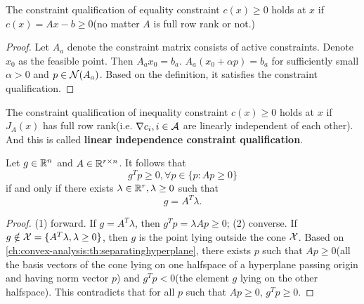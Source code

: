\begin{refsection}
\begin{lemma}
	The constraint qualification of equality constraint $c(x) \geq 0$ holds at $x$ if $c(x) = Ax - b \geq 0$(no matter $A$ is full row rank or not.) 
\end{lemma}
\begin{proof}
Let $A_a$ denote the constraint matrix consists of active constraints. Denote $x_0$ as the feasible point. Then $A_a x_0 = b_a$. $A_a(x_0 + \alpha p) = b_a$ for sufficiently small $\alpha > 0$ and $p\in \mathcal{N}(A_a)$. Based on the definition, it satisfies the constraint qualification.
\end{proof}


\begin{lemma}\cite[324]{nocedal2006numerical}
The constraint qualification of inequality constraint $c(x) \geq 0$ holds at $x$ if $J_A(x)$ has full row rank(i.e. $\nabla c_i, i\in \mathcal{A}$ are linearly independent of each other). And this is called \textbf{linear independence constraint qualification}.
\end{lemma}




\begin{lemma}\label{ch:constrained-nonlinear-optimization:th:FarkasLemmaAlternative}
Let $g\in \mathbb{R}^n$ and $A\in \mathbb{R}^{r\times n}$. It follows that
$$g^Tp \geq 0, \forall p\in \{p: Ap\geq 0\}$$
if and only if there exists $\lambda \in \mathbb{R}^r,\lambda \geq 0$ such that
$$g = A^T\lambda.$$
\end{lemma}
\begin{proof}
(1) forward. If $g = A^T\lambda$, then $g^Tp = \lambda Ap \geq 0$; (2) converse. If $g \notin \mathcal{X} = \{A^T\lambda, \lambda\geq 0\}$, then $g$ is the point lying outside the cone $\mathcal{X}$. Based on \autoref{ch:convex-analysis:th:separatinghyperplane}, there exists $p$ such that $Ap \geq 0$(all the basis vectors of the cone lying on one halfspace of a hyperplane passing origin and having norm vector $p$) and $g^Tp <0$(the element $g$ lying on the other halfspace). This contradicts that for all $p$ such that $Ap\geq 0$, $g^Tp \geq 0$.
\end{proof}



\end{refsection}
